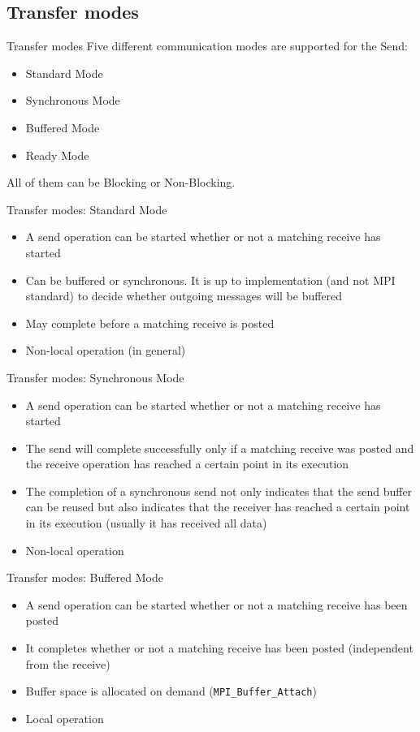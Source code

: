 \documentclass[aspectratio=43]{beamer}
\begin{document}
\subsection{Transfer modes}
\begin{frame}{Transfer modes}
Five different communication modes are supported for the Send:
\begin{itemize}
    \item Standard Mode
    \item Synchronous Mode
    \item Buffered Mode
    \item Ready Mode
\end{itemize}
All of them can be Blocking or Non-Blocking.
\end{frame}


\begin{frame}{Transfer modes: Standard Mode}
\begin{itemize}
\item A send operation can be started whether or not a matching receive has started
\item Can be buffered or synchronous. It is up to implementation (and not MPI standard) to decide whether outgoing messages will be buffered
\item May complete before a matching receive is posted
\item Non-local operation (in general)
\end{itemize}
\end{frame}

\begin{frame}{Transfer modes: Synchronous Mode}
\begin{itemize}
\item A send operation can be started whether or not a matching receive has started
\item The send will complete successfully only if a matching receive was posted and the receive operation has reached a certain point in its execution
\item The completion of a synchronous send not only indicates that the send buffer can be reused but also indicates that the receiver has reached a certain point in its execution (usually it has received all data)
\item Non-local operation
\end{itemize}
\end{frame}

\begin{frame}[fragile]{Transfer modes: Buffered Mode}
\begin{itemize}
\item A send operation can be started whether or not a matching receive has been posted
\item It completes whether or not a matching receive has been posted (independent from the receive)
\item Buffer space is allocated on demand (\verb+MPI_Buffer_Attach+)
\item Local operation
\end{itemize}
\end{frame}
\end{document}
